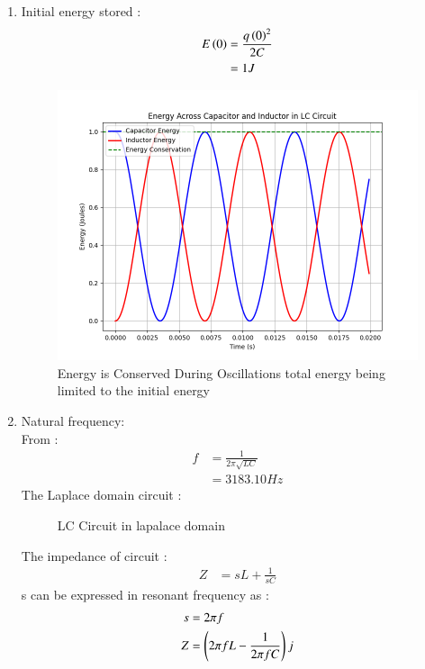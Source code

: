 \documentclass[journal,12pt,twocolumn]{IEEEtran}
\theoremstyle{remark}
\begin{document}
\begin{enumerate}[label=\textbf{(\alph*)}]
    \item Initial energy stored :
    \begin{align}
        E\left(0\right)&= \frac{{q\left(0\right)}^2}{2C}\\
            &=  1 J 
    \end{align}
\begin{figure}[H]
    \includegraphics[width=1\columnwidth]{figs/Plot_energy.png}
    \caption{Energy is Conserved During Oscillations total energy being limited to the initial energy}
    \label{fig:energy_plots}
\end{figure}
 \item Natural frequency:\\
 From :
   \begin{align}
         f&=\frac{1}{2\pi\sqrt{LC}}\\
          &=3183.10 Hz
   \end{align}
The Laplace domain circuit :
\begin{figure}[H]
    \centering
    \resizebox{0.2\textwidth}{!}{}
    \caption{LC Circuit in lapalace domain}
    \label{fig:ncert_12.7.12_cktdiag_lap}
\end{figure}
The impedance of circuit :
\begin{align}
    Z &= sL + \frac{1}{sC}
\end{align}
s can be expressed in resonant frequency as :
\begin{align}
    s &= 2\pi f\\
    Z &= \brak{2\pi fL - \frac{1}{2\pi fC}}j\\

\end{align}
\end{enumerate}
\end{document}
